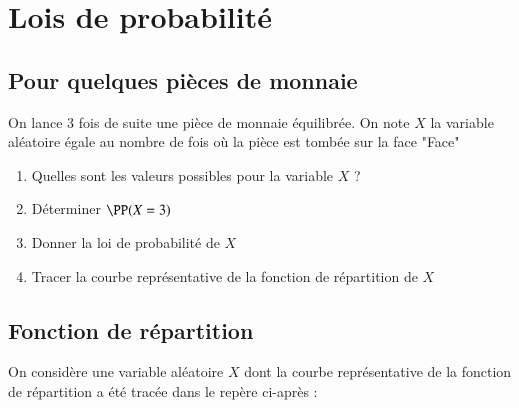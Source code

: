 \documentclass[oneside,12pt]{article}          %
\begin{document}
\section{Lois de probabilité}

\subsection{Pour quelques pièces de monnaie}
On lance $3$ fois de suite une pièce de monnaie équilibrée. On note $X$ la variable aléatoire égale au nombre de fois où la pièce est tombée sur la face "Face"
\begin{enumerate}
    \item Quelles sont les valeurs possibles pour la variable $X$ ?
    \item Déterminer $\PP(X=3)$
    \item Donner la loi de probabilité de $X$
    \item Tracer la courbe représentative de la fonction de répartition de $X$
\end{enumerate}



\subsection{Fonction de répartition}
On considère une variable aléatoire $X$ dont la courbe représentative de la fonction de répartition a été tracée dans le repère ci-après :
\end{document}
